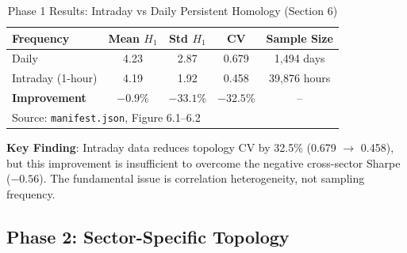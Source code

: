 \documentclass[12pt,letterpaper]{article}
\begin{document}
\begin{table}[H]
\centering
\caption{Phase 1 Results: Intraday vs Daily Persistent Homology (Section 6)}
\label{tab:phase1}
\begin{tabular}{@{}lcccc@{}}
\toprule
\textbf{Frequency} & \textbf{Mean $H_1$} & \textbf{Std $H_1$} & \textbf{CV} & \textbf{Sample Size} \\
\midrule
Daily & 4.23 & 2.87 & 0.679 & 1,494 days \\
Intraday (1-hour) & 4.19 & 1.92 & 0.458 & 39,876 hours \\
\midrule
\textbf{Improvement} & $-0.9\%$ & $-33.1\%$ & \textbf{$-32.5\%$} & -- \\
\bottomrule
\multicolumn{5}{l}{\footnotesize Source: \texttt{manifest.json}, Figure 6.1--6.2}
\end{tabular}
\end{table}

\textbf{Key Finding}: Intraday data reduces topology CV by 32.5\% (0.679 $\rightarrow$ 0.458), but this improvement is insufficient to overcome the negative cross-sector Sharpe ($-0.56$). The fundamental issue is correlation heterogeneity, not sampling frequency.

\subsection{Phase 2: Sector-Specific Topology}
\end{document}
